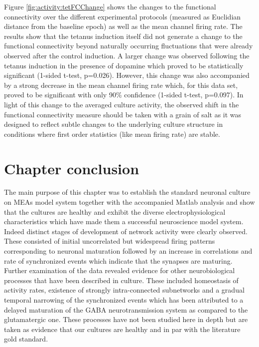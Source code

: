            Figure \ref{fig:activity:tetFCChange} shows the changes to the functional connectivity over the different experimental protocols (measured as Euclidian distance from the baseline epoch) as well as the mean channel firing rate. The results show that the tetanus induction itself did not generate a change to the functional connectivity beyond naturally occurring fluctuations that were already observed after the control induction. A larger change was observed following the tetanus induction in the presence of dopamine which proved to be statistically significant (1-sided t-test, p=0.026). However, this change was also accompanied by a strong decrease in the mean channel firing rate which, for this data set, proved to be significant with only 90\% confidence (1-sided t-test, p=0.097). In light of this change to the averaged culture activity, the observed shift in the functional connectivity measure should be taken with a grain of salt as it was designed to reflect subtle changes to the underlying culture structure in conditions where first order statistics (like mean firing rate) are stable.


    \section{Chapter conclusion}
    The main purpose of this chapter was to establish the standard neuronal culture on MEAs model system together with the accompanied Matlab analysis and show that the cultures are healthy and exhibit the diverse electrophysiological characteristics which have made them a successful neuroscience model system. Indeed distinct stages of development of network activity were clearly observed. These consisted of initial uncorrelated but widespread firing patterns corresponding to neuronal maturation followed by an increase in correlations and rate of synchronized events which indicate that the synapses are maturing. Further examination of the data revealed evidence for other neurobiological processes that have been described in culture. These included homeostasis of activity rates, existence of strongly intra-connected subnetworks and a gradual temporal narrowing of the synchronized events which has been attributed to a delayed maturation of the GABA neurotransmission system as compared to the glutamatergic one. These processes have not been studied here in depth but are taken as evidence that our cultures are healthy and in par with the literature gold standard.

